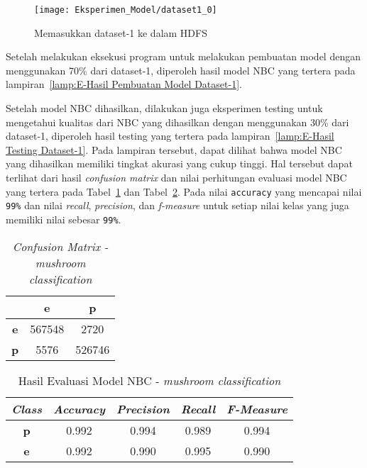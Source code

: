 \begin{figure}[H]
	\centering
	\texttt{[image: Eksperimen\_Model/dataset1\_0]}
	\caption[Memasukkan dataset-1 ke dalam HDFS]{Memasukkan dataset-1 ke dalam HDFS}
	\label{fig:Memasukkan dataset-1 ke dalam HDFS}
\end{figure}

Setelah melakukan eksekusi program untuk melakukan pembuatan model dengan menggunakan 70\% dari dataset-1, diperoleh hasil model NBC yang tertera pada lampiran~\ref{lamp:E-Hasil Pembuatan Model Dataset-1}.

Setelah model NBC dihasilkan, dilakukan juga eksperimen testing untuk mengetahui kualitas dari NBC yang dihasilkan dengan menggunakan 30\% dari dataset-1, diperoleh hasil testing yang tertera pada lampiran~\ref{lamp:E-Hasil Testing Dataset-1}. Pada lampiran tersebut, dapat dilihat bahwa model NBC yang dihasilkan memiliki tingkat akurasi yang cukup tinggi. Hal tersebut dapat terlihat dari hasil \textit{confusion matrix} dan nilai perhitungan evaluasi model NBC yang tertera pada Tabel~\ref{tab:confusion matrix - mushroom} dan Tabel~\ref{tab:model evaluation - mushroom}. Pada nilai \texttt{accuracy} yang mencapai nilai \texttt{99\%} dan nilai \textit{recall}, \textit{precision}, dan \textit{f-measure} untuk setiap nilai kelas yang juga memiliki nilai sebesar \texttt{99\%}.

\begin{table}[H]
\label{tab:confusion matrix - mushroom}
\centering
\caption{\textit{Confusion Matrix - mushroom classification}}
\begin{tabular}{ | c | c | c | }
\hline
& \textbf{e} & \textbf{p}\\ \hline \hline
\textbf{e} & 567548 & 2720 \\ \hline
\textbf{p} & 5576 & 526746 \\ \hline
\end{tabular}
\end{table}

\begin{table}[H]
\label{tab:model evaluation - mushroom}
\centering
\caption{Hasil Evaluasi Model NBC - \textit{mushroom classification}}
\begin{tabular}{ | c | c | c | c | c | }
\hline
\textit{\textbf{Class}} & \textit{\textbf{Accuracy}} & \textit{\textbf{Precision}} & \textit{\textbf{Recall}} & \textit{\textbf{F-Measure}}\\ \hline \hline
\textbf{p} & 0.992 & 0.994 & 0.989 & 0.994 \\ \hline
\textbf{e} & 0.992 & 0.990 & 0.995 & 0.990 \\ \hline
\end{tabular}
\end{table}

